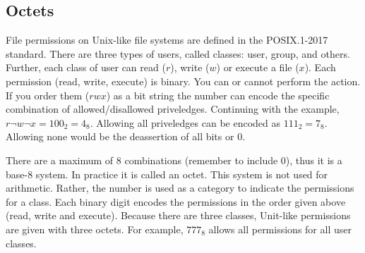 \begin{figure}[h]
\end{figure}

\subsection{Octets}

File permissions on Unix-like file systems are defined in the POSIX.1-2017 standard. There 
are three types of users, called classes: user, group, and others. Further, each class of user can 
read ($r$), write ($w$) or execute a file ($x$). Each permission (read, write, execute) is binary. 
You can or cannot perform the action. If you order them ($rwx$) as a bit string the number can 
encode the specific combination of allowed/disallowed priveledges. Continuing with the example, 
$r\neg w \neg x = 100_2 = 4_{8}$. Allowing all priveledges can be encoded 
as $111_2 = 7_{8}$.  Allowing none would be the deassertion of all bits or $0$.

There are a maximum of 8 combinations (remember to include 0), thus it is a 
\gls{base-8} system. In practice it is called an octet. This system is not used for arithmetic. Rather,
the number is used as a category to indicate the permissions for a class. Each binary digit encodes 
the permissions in the order given above (read, write and execute). Because there are three classes, 
Unit-like permissions are given with three octets. For example, $777_8$ allows all permissions 
for all user classes.

